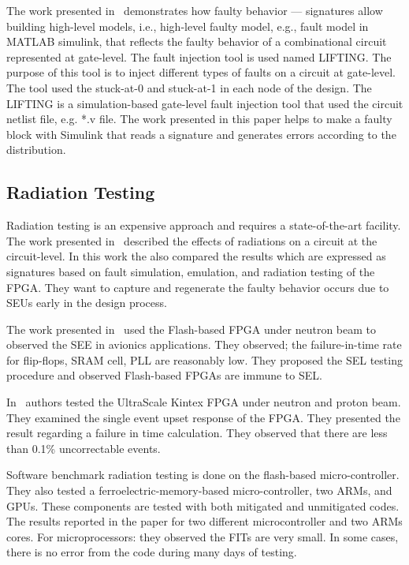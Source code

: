 The work presented in~\citep{robache2013methodology} demonstrates how faulty behavior --- signatures allow building high-level models, i.e., high-level faulty model, e.g., fault model in MATLAB simulink, that reflects the faulty behavior of a combinational circuit represented at gate-level. The fault injection tool is used named  LIFTING.  The purpose of this tool is to inject different types of faults on a circuit at gate-level. The tool used the stuck-at-0 and stuck-at-1 in each node of the design. The LIFTING is a simulation-based gate-level fault injection tool that used the circuit netlist file, e.g.  *.v file. The work presented in this paper helps to make a faulty block with Simulink that reads a signature and generates errors according to the distribution.

\subsection{Radiation Testing}
Radiation testing is an expensive approach and requires a state-of-the-art facility. The work presented in~\cite{hobeika2014multi} described the effects of radiations on a circuit at the circuit-level. In this work the also compared the results which are expressed as signatures based on fault simulation, emulation, and radiation testing of the FPGA. They want to capture and regenerate the faulty behavior occurs due to SEUs early in the design process. 

The work presented in~\citep{dsilva2015neutron} used the Flash-based FPGA under neutron beam to observed the SEE in avionics applications. They observed; the failure-in-time rate for flip-flops, SRAM cell, PLL are reasonably low. They proposed the SEL testing procedure and observed Flash-based FPGAs are immune to SEL. 

In~\citep{maillard2015neutron} authors tested the UltraScale Kintex FPGA under neutron and proton beam. They examined the single event upset response of the FPGA. They presented the result regarding a failure in time calculation. They observed that there are less than 0.1\% uncorrectable events. 


Software benchmark radiation testing is done on the flash-based micro-controller. They also tested a ferroelectric-memory-based micro-controller, two ARMs, and GPUs. These components are tested with both mitigated and unmitigated codes. The results reported in the paper for two different microcontroller and two ARMs cores. For microprocessors: they observed the FITs are very small. In some cases, there is no error from the code during many days of testing. 










